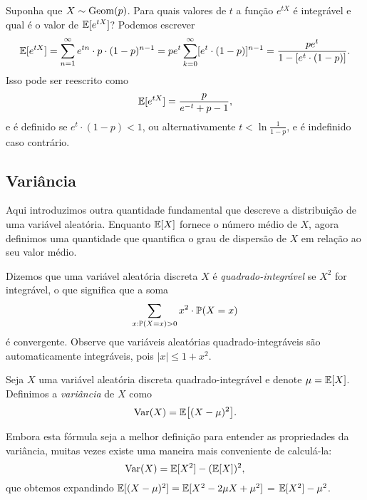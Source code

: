 \begin{example}
Suponha que $X \sim \mathrm{Geom}(p)$.
Para quais valores de $t$ a função $e^{tX}$ é integrável e qual é o valor de $\mathbb{E}[e^{tX}]$?
Podemos escrever
\[
\mathbb{E}[e^{tX}]
=
\sum_{n=1}^\infty e^{tn} \cdot p \cdot (1-p)^{n-1}
=
pe^t
\sum_{k=0}^\infty [e^t \cdot (1-p)]^{n-1}
=
\frac{pe^t}{1- [e^t \cdot (1-p)]}
.
\]
Isso pode ser reescrito como
\[
\mathbb{E}[e^{tX}] = \frac{p}{e^{-t}+p-1}
,
\]
e é definido se $ e^t \cdot (1-p) < 1 $, ou alternativamente $ t < \ln\frac{1}{1-p} $, e é indefinido caso contrário.
\end{example}

\subsection{Variância}

Aqui introduzimos outra quantidade fundamental que descreve a distribuição de uma variável aleatória.
Enquanto $ \mathbb{E}[X] $ fornece o número médio de $ X $, agora definimos uma quantidade que quantifica o grau de dispersão de $ X $ em relação ao seu valor médio.

\begin{definition}
Dizemos que uma variável aleatória discreta $X$ é \emph{quadrado-integrável} se $X^2$ for integrável, o que significa que a soma
\[
\sum_{x : \mathbb{P}(X=x)>0 } x^2 \cdot \mathbb{P}(X=x)
\]
é convergente.
Observe que variáveis aleatórias quadrado-integráveis são automaticamente integráveis, pois $ |x| \leq 1 + x^2 $.
\end{definition}

\begin{definition}
[Variância]
Seja $X$ uma variável aleatória discreta quadrado-integrável e denote $ \mu = \mathbb{E}[X] $.
Definimos a \emph{variância} de $ X $ como
\[
\mathrm{Var} (X) = \mathbb{E}\big[ (X - \mu)^2 \big]
.
\]
\end{definition}

Embora esta fórmula seja a melhor definição para entender as propriedades da variância, muitas vezes existe uma maneira mais conveniente de calculá-la:
\[
\mathrm{Var} (X) = \mathbb{E}[X^2] - (\mathbb{E}[X])^2
,
\]
que obtemos expandindo $ \mathbb{E}[(X - \mu)^2] = \mathbb{E}[X^2 -2 \mu X + \mu^2]$ = $ \mathbb{E}[X^2] - \mu^2 $.

